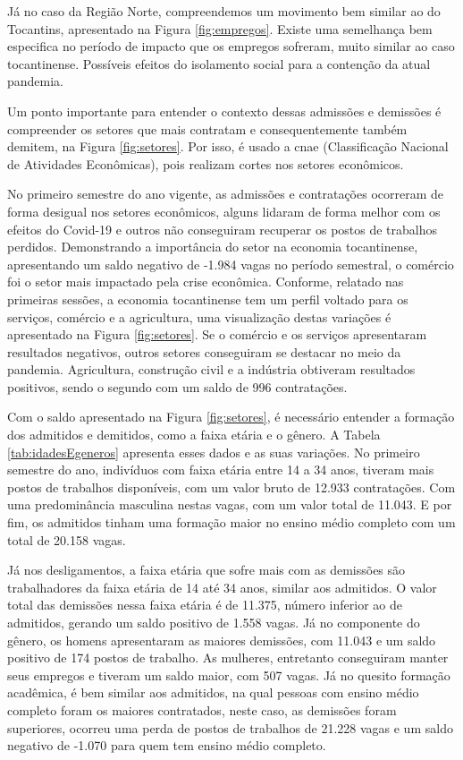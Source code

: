 \par Já no caso da Região Norte, compreendemos um movimento bem similar ao do Tocantins, apresentado na Figura \ref{fig:empregos}. Existe uma semelhança bem especifica no período de impacto que os empregos sofreram, muito similar ao caso tocantinense. Possíveis efeitos do isolamento social para a contenção da atual pandemia.

\par Um ponto importante para entender o contexto dessas admissões e demissões é compreender os setores que mais contratam e consequentemente também demitem, na Figura \ref{fig:setores}. Por isso, é usado a \acrshort{cnae} (Classificação Nacional de Atividades Econômicas), pois realizam cortes nos setores econômicos.

\par No primeiro semestre do ano vigente, as admissões e contratações ocorreram de forma desigual nos setores econômicos, alguns lidaram de forma melhor com os efeitos do Covid-19 e outros não conseguiram recuperar os postos de trabalhos perdidos. Demonstrando a importância do setor na economia tocantinense, apresentando um saldo negativo de -1.984 vagas no período semestral, o comércio foi o setor mais impactado pela crise econômica. Conforme, relatado nas primeiras sessões, a economia tocantinense tem um perfil voltado para os serviços, comércio e a agricultura, uma visualização destas variações é apresentado na Figura \ref{fig:setores}. Se o comércio e os serviços apresentaram resultados negativos, outros setores conseguiram se destacar no meio da pandemia. Agricultura, construção civil e a indústria obtiveram resultados positivos, sendo o segundo com um saldo de 996 contratações.


\par Com o saldo apresentado na Figura \ref{fig:setores}, é necessário entender a formação dos admitidos e demitidos, como a faixa etária e o gênero. A Tabela \ref{tab:idadesEgeneros} apresenta esses dados e as suas variações. No primeiro semestre do ano, indivíduos com faixa etária entre 14 a 34 anos, tiveram mais postos de trabalhos disponíveis, com um valor bruto de 12.933 contratações. Com uma predominância masculina nestas vagas, com um valor total de 11.043. E por fim, os admitidos tinham uma formação maior no ensino médio completo com um total de 20.158 vagas.

\par Já nos desligamentos, a faixa etária que sofre mais com as demissões são trabalhadores da faixa etária de 14 até 34 anos, similar aos admitidos. O valor total das demissões nessa faixa etária é de 11.375, número inferior ao de admitidos, gerando um saldo positivo de 1.558 vagas. Já no componente do gênero, os homens apresentaram as maiores demissões, com 11.043 e um saldo positivo de 174 postos de trabalho. As mulheres, entretanto conseguiram manter seus empregos e tiveram um saldo maior, com 507 vagas. Já no quesito formação acadêmica, é bem similar aos admitidos, na qual pessoas com ensino médio completo foram os maiores contratados, neste caso, as demissões foram superiores, ocorreu uma perda de postos de trabalhos de 21.228 vagas e um saldo negativo de -1.070 para quem tem ensino médio completo.


